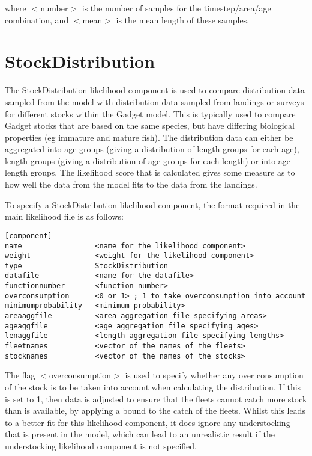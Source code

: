 \documentclass [a4paper, 10pt]{book}
\begin{document}
where $<$number$>$ is the number of samples for the timestep/area/age combination, and $<$mean$>$ is the mean length of these samples.

\section{StockDistribution}\label{sec:stockdist}
The StockDistribution likelihood component is used to compare distribution data sampled from the model with distribution data sampled from landings or surveys for different stocks within the Gadget model.  This is typically used to compare Gadget stocks that are based on the same species, but have differing biological properties (eg immature and mature fish).  The distribution data can either be aggregated into age groups (giving a distribution of length groups for each age), length groups (giving a distribution of age groups for each length) or into age-length groups.  The likelihood score that is calculated gives some measure as to how well the data from the model fits to the data from the landings.

\bigskip
To specify a StockDistribution likelihood component, the format required in the main likelihood file is as follows:

\begin{verbatim}
[component]
name                 <name for the likelihood component>
weight               <weight for the likelihood component>
type                 StockDistribution
datafile             <name for the datafile>
functionnumber       <function number>
overconsumption      <0 or 1> ; 1 to take overconsumption into account
minimumprobability   <minimum probability>
areaaggfile          <area aggregation file specifying areas>
ageaggfile           <age aggregation file specifying ages>
lenaggfile           <length aggregation file specifying lengths>
fleetnames           <vector of the names of the fleets>
stocknames           <vector of the names of the stocks>
\end{verbatim}

The flag $<$overconsumption$>$ is used to specify whether any over consumption of the stock is to be taken into account when calculating the distribution.  If this is set to 1, then data is adjusted to ensure that the fleets cannot catch more stock than is available, by applying a bound to the catch of the fleets.  Whilst this leads to a better fit for this likelihood component, it does ignore any understocking that is present in the model, which can lead to an unrealistic result if the understocking likelihood component is not specified.
\end{document}
